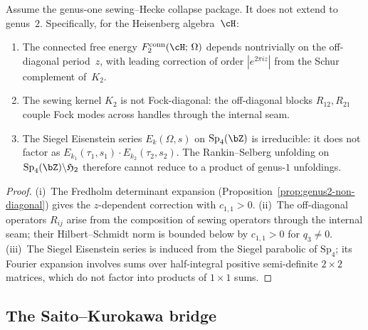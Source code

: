 \begin{theorem}%
\label{thm:genus2-non-collapse}%
%
Assume the genus-one sewing--Hecke collapse package. It does not
extend to genus~$2$. Specifically, for the
Heisenberg algebra~$\cH$:
\begin{enumerate}[label=\textup{(\roman*)}]
\item The connected free energy
 $F_2^{\mathrm{conn}}(\cH;\,\Omega)$ depends
 nontrivially on the off-diagonal period~$z$, with
 leading correction of order $|e^{2\pi i z}|$ from the
 Schur complement of~$K_2$.
\item The sewing kernel $K_2$ is not Fock-diagonal:
 the off-diagonal blocks $R_{12}, R_{21}$ couple Fock
 modes across handles through the internal seam.
\item The Siegel Eisenstein series
 $E_k(\Omega, s)$ on $\mathrm{Sp}_4(\bZ)$ is irreducible:
 it does not factor as $E_{k_1}(\tau_1, s_1)
 \cdot E_{k_2}(\tau_2, s_2)$. The Rankin--Selberg
 unfolding on $\mathrm{Sp}_4(\bZ) \backslash \mathfrak{H}_2$
 therefore cannot reduce to a product of genus-$1$
 unfoldings.
\end{enumerate}
\end{theorem}

\begin{proof}
(i)~The Fredholm determinant expansion
(Proposition~\ref{prop:genus2-non-diagonal}) gives the
$z$-dependent correction with $c_{1,1} > 0$.
(ii)~The off-diagonal operators $R_{ij}$ arise from
the composition of sewing operators through the internal
seam; their Hilbert--Schmidt norm is bounded below by
$c_{1,1} > 0$ for $q_3 \neq 0$.
(iii)~The Siegel Eisenstein series is induced from the
Siegel parabolic of $\mathrm{Sp}_4$; its Fourier expansion
involves sums over half-integral positive semi-definite
$2 \times 2$ matrices, which do not factor into products of
$1 \times 1$ sums.
\end{proof}

\subsection{The Saito--Kurokawa bridge}%
\label{subsec:saito-kurokawa-bridge}

